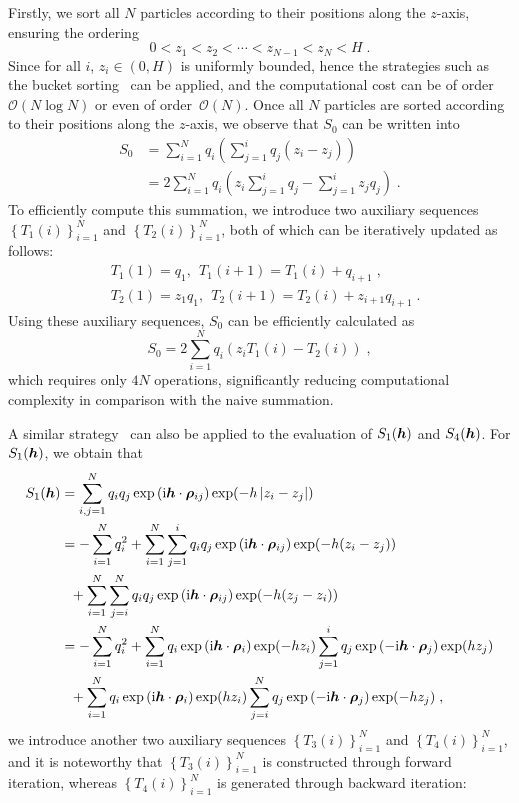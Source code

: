 Firstly, we sort all $N$ particles according to their positions along the 
$z$-axis, ensuring the ordering
\begin{equation*}
   0 < z_1 < z_2 <  \cdots <  z_{N - 1}<z_N < H\;.
\end{equation*}
Since for all  $i$, $z_i \in (0, H)$ is uniformly bounded, hence  the strategies such as the bucket sorting~\cite{corwin2004sorting} can be applied, and the computational cost can be of order~$\mathcal{O}(N \log{N})$ or even  of order~$\mathcal{O}(N)$. Once all $N$ particles are sorted according to their positions along the 
$z$-axis, we observe that $S_0$ can be written into
\begin{align*}
    S_0 
    & = \sum_{i = 1}^N q_i \left( \sum_{j = 1}^{i }{q_j (z_i - z_j)} \right) \\
    & = 2 \sum_{i = 1}^N q_i \left( z_i \sum_{j = 1}^{i }q_j - \sum_{j = 1}^{i }z_j q_j  \right) \;.
\end{align*}
To efficiently compute this summation, we introduce two auxiliary sequences  $\left\{T_1(i)\right\}_{i=1}^N$ and $\left\{T_2(i)\right\}_{i=1}^N$, both of which  can be iteratively updated as follows:
\begin{align*}
    &T_1(1)=q_1,~~T_1(i+1)=T_1(i)+q_{i+1}\;,\\
    &T_2(1)=z_1q_1,~~T_2(i+1)=T_2(i)+z_{i+1}q_{i+1}\;.
\end{align*}
Using these auxiliary sequences, 
$S_0$ can be efficiently calculated as
\[
S_0= 2 \sum_{i = 1}^N q_i \left( z_iT_1(i)-T_2(i)\right)\;,
\]
which requires only 
$4N$ operations, significantly reducing computational complexity in comparison with the naive summation.

A similar strategy~\cite{jiang2021approximating, gan2024fast} can also be applied to the evaluation of $S_1(\boldsymbol{h})$ and $S_4(\boldsymbol{h})$. For $S_1(\boldsymbol{h})$, we obtain that 
\begin{align*}
S_1(\boldsymbol{h})&=\sum_{i,j=1}^Nq_iq_j  \exp{(\mathrm{i} \boldsymbol{h} \cdot \boldsymbol{\rho}_{ij})}\exp(-h\left\lvert z_i-z_j\right\rvert)\\
&=-\sum_{i=1}^Nq_i^2+\sum_{i=1}^N \sum_{j=1}^iq_iq_j  \exp{(\mathrm{i} \boldsymbol{h} \cdot \boldsymbol{\rho}_{ij})}\exp(-h(z_i-z_j))\\
&~~+\sum_{i=1}^N \sum_{j=i}^Nq_iq_j  \exp{(\mathrm{i} \boldsymbol{h} \cdot \boldsymbol{\rho}_{ij})}\exp(-h(z_j-z_i))\\
&= -\sum_{i=1}^Nq_i^2+\sum_{i=1}^N q_i\exp{(\mathrm{i} \boldsymbol{h} \cdot \boldsymbol{\rho}_{i})}\exp(-hz_i)\sum_{j=1}^iq_j\exp{(-\mathrm{i} \boldsymbol{h} \cdot \boldsymbol{\rho}_{j})}\exp(hz_j)\\
&~~+\sum_{i=1}^N q_i\exp{(\mathrm{i} \boldsymbol{h} \cdot \boldsymbol{\rho}_{i})}\exp(hz_i)\sum_{j=i}^Nq_j\exp{(-\mathrm{i} \boldsymbol{h} \cdot \boldsymbol{\rho}_{j})}\exp(-hz_j)\;,
\end{align*}
 we introduce another two auxiliary sequences  $\left\{T_3(i)\right\}_{i=1}^N$ and $\left\{T_4(i)\right\}_{i=1}^N$, and it is noteworthy that $\left\{T_3(i)\right\}_{i=1}^N$ is  constructed through forward iteration, whereas  $\left\{T_4(i)\right\}_{i=1}^N$   is generated through backward iteration:

